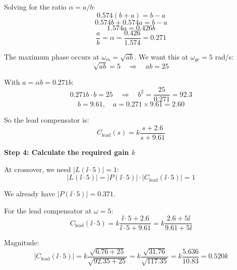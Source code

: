 \documentclass[11pt,a4paper]{article}
\begin{document}
Solving for the ratio $\alpha = a/b$:
\begin{equation}
  0.574(b + a) = b - a
\end{equation}
\begin{equation}
  0.574b + 0.574a = b - a
\end{equation}
\begin{equation}
  1.574a = 0.426b
\end{equation}
\begin{equation}
  \frac{a}{b} = \alpha = \frac{0.426}{1.574} = 0.271
\end{equation}

The maximum phase occurs at $\omega_m = \sqrt{ab}$. We want this at $\omega_{gc} = 5$ rad/s:
\begin{equation}
  \sqrt{ab} = 5 \quad \Rightarrow \quad ab = 25
\end{equation}

With $a = \alpha b = 0.271b$:
\begin{equation}
  0.271b \cdot b = 25 \quad \Rightarrow \quad b^2 = \frac{25}{0.271} = 92.3
\end{equation}
\begin{equation}
  b = 9.61, \quad a = 0.271 \times 9.61 = 2.60
\end{equation}

So the lead compensator is:
\begin{equation}
  C_{\text{lead}}(s) = k\frac{s + 2.6}{s + 9.61}
\end{equation}

\textbf{Step 4: Calculate the required gain $k$}

At crossover, we need $|L(\ii \cdot 5)| = 1$:
\begin{equation}
  |L(\ii \cdot 5)| = |P(\ii \cdot 5)| \cdot |C_{\text{lead}}(\ii \cdot 5)| = 1
\end{equation}

We already have $|P(\ii \cdot 5)| = 0.371$.

For the lead compensator at $\omega = 5$:
\begin{equation}
  C_{\text{lead}}(\ii \cdot 5) = k\frac{\ii \cdot 5 + 2.6}{\ii \cdot 5 + 9.61} = k\frac{2.6 + 5\ii}{9.61 + 5\ii}
\end{equation}

Magnitude:
\begin{equation}
  |C_{\text{lead}}(\ii \cdot 5)| = k\frac{\sqrt{6.76 + 25}}{\sqrt{92.35 + 25}} = k\frac{\sqrt{31.76}}{\sqrt{117.35}} = k\frac{5.636}{10.83} = 0.520k
\end{equation}
\end{document}
